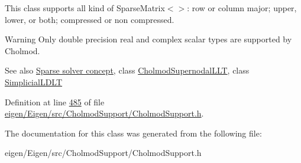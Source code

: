 This class supports all kind of Sparse\+Matrix$<$$>$\+: row or column major; upper, lower, or both; compressed or non compressed.

\begin{DoxyWarning}{Warning}
Only double precision real and complex scalar types are supported by Cholmod.
\end{DoxyWarning}
\begin{DoxySeeAlso}{See also}
\hyperlink{SparseLinearSystems.dox_TutorialSparseSolverConcept}{Sparse solver concept}, class \hyperlink{class_eigen_1_1_cholmod_supernodal_l_l_t}{Cholmod\+Supernodal\+L\+LT}, class \hyperlink{group___sparse_cholesky___module_class_eigen_1_1_simplicial_l_d_l_t}{Simplicial\+L\+D\+LT} 
\end{DoxySeeAlso}


Definition at line \hyperlink{eigen_2_eigen_2src_2_cholmod_support_2_cholmod_support_8h_source_l00485}{485} of file \hyperlink{eigen_2_eigen_2src_2_cholmod_support_2_cholmod_support_8h_source}{eigen/\+Eigen/src/\+Cholmod\+Support/\+Cholmod\+Support.\+h}.



The documentation for this class was generated from the following file\+:\begin{DoxyCompactItemize}
\item 
eigen/\+Eigen/src/\+Cholmod\+Support/\+Cholmod\+Support.\+h\end{DoxyCompactItemize}
